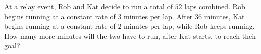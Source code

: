 At a relay event, Rob and Kat decide to run a total of $52$ laps combined. Rob begins running at a constant rate of $3$ minutes per lap. After $36$ minutes, Kat begins running at a constant rate of $2$ minutes per lap, while Rob keeps running. How many more minutes will the two have to run, after Kat starts, to reach their goal?
